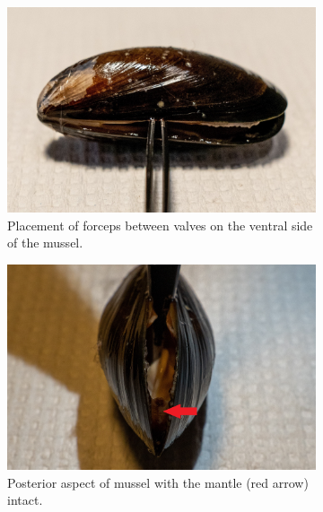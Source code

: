 \begin{figure}
    \centering
    \begin{subfigure}[b]{.45\textwidth}
        \centering
        \includegraphics[width=\textwidth]{figures/Sampling technique/forceps square color.jpg}
        \caption{Placement of forceps between valves on the ventral side of the mussel.}
        \label{sfig:a}
    \end{subfigure}
    \hfill
    \begin{subfigure}[b]{.45\textwidth}
        \centering
        \includegraphics[width=\textwidth]{figures/Sampling technique/uncut color 3495.jpg}
        \caption{Posterior aspect of mussel with the mantle (red arrow) intact.}
        \label{sfig:b}
    \end{subfigure}
    \newline
    \begin{subfigure}[b]{.45\textwidth}

\end{subfigure}
\end{figure}

